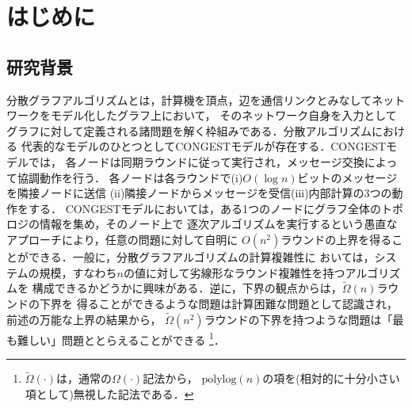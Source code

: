 \documentclass[12pt]{thesis}
\newcommand{\CONGEST}{\textsf{CONGEST}}
\theoremstyle{definition}
\begin{document}
\baselineskip=22pt
\pagestyle{empty}

\maketitle

\pagestyle{myheadings}	%
\tableofcontents

\newpage


\chapter{はじめに}

\section{研究背景}
分散グラフアルゴリズムとは，計算機を頂点，辺を通信リンクとみなしてネットワークをモデル化したグラフ上において，
そのネットワーク自身を入力としてグラフに対して定義される諸問題を解く枠組みである．分散アルゴリズムにおける
代表的なモデルのひとつとして{{\CONGEST}}モデルが存在する．{\CONGEST}モデルでは，
各ノードは同期ラウンドに従って実行され，メッセージ交換によって協調動作を行う．
各ノードは各ラウンドで(i)$O(\log n)$ビットのメッセージを隣接ノードに送信
(ii)隣接ノードからメッセージを受信(iii)内部計算の3つの動作をする．
{\CONGEST}モデルにおいては，ある1つのノードにグラフ全体のトポロジの情報を集め，そのノード上で
逐次アルゴリズムを実行するという愚直なアプローチにより，任意の問題に対して自明に
$O (n^{2})$ラウンドの上界を得ることができる．一般に，分散グラフアルゴリズムの計算複雑性に
おいては，システムの規模，すなわち$n$の値に対して劣線形なラウンド複雑性を持つアルゴリズムを
構成できるかどうかに興味がある．逆に，下界の観点からは，$\tilde{\Omega}(n)$ラウンドの下界を
得ることができるような問題は計算困難な問題として認識され，前述の万能な上界の結果から，
$\tilde{\Omega}(n^2)$ラウンドの下界を持つような問題は「最も難しい」問題ととらえることができる
\footnote{$\tilde{\Omega}(\cdot)$は，通常の$\Omega(\cdot)$記法から，
$\mathrm{polylog}(n)$の項を(相対的に十分小さい項として)無視した記法である．}．
\end{document}
